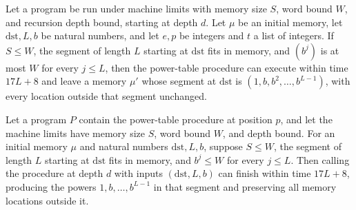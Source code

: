 \begin{theorem}
\label{Light.powTable_ends}
\leanok
{}
Let a program be run under machine limits with memory size $S$, word bound $W$, and
recursion depth bound, starting at depth $d$. Let $\mu$ be an initial memory, let
$\mathrm{dst},L,b$ be natural numbers, and let $e,p$ be integers and $t$ a list of
integers. If $S\le W$, the segment of length $L$ starting at $\mathrm{dst}$ fits in
memory, and $(b^j)$ is at most $W$ for every $j\le L$, then the power-table procedure
can execute within time $17L+8$ and leave a memory $\mu'$ whose segment at
$\mathrm{dst}$ is $(1,b,b^2,\ldots,b^{L-1})$, with every location outside that segment
unchanged.
\end{theorem}

\begin{theorem}
\label{Light.powTable_meets}
\leanok
{}
Let a program $P$ contain the power-table procedure at position $p$, and let the machine
limits have memory size $S$, word bound $W$, and depth bound. For an initial memory
$\mu$ and natural numbers $\mathrm{dst},L,b$, suppose $S\le W$, the segment of length
$L$ starting at $\mathrm{dst}$ fits in memory, and $b^j\le W$ for every $j\le L$. Then
calling the procedure at depth $d$ with inputs $(\mathrm{dst},L,b)$ can finish within
time $17L+8$, producing the powers $1,b,\ldots,b^{L-1}$ in that segment and preserving
all memory locations outside it.
\end{theorem}
